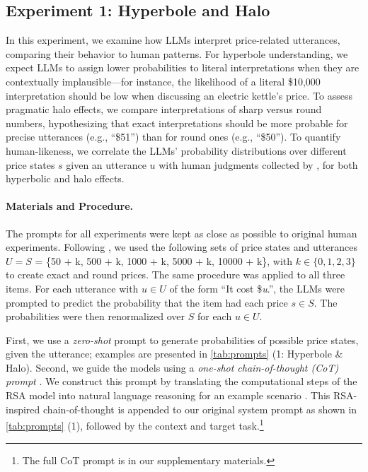 \subsection{Experiment 1: Hyperbole and Halo}
In this experiment, we examine how LLMs interpret price-related utterances, comparing their behavior to human patterns. For hyperbole understanding, we expect LLMs to assign lower probabilities to literal interpretations when they are contextually implausible—for instance, the likelihood of a literal \$10,000 interpretation should be low when discussing an electric kettle's price. To assess pragmatic halo effects, we compare interpretations of sharp versus round numbers, hypothesizing that exact interpretations should be more probable for precise utterances (e.g., ``\$51'') than for round ones (e.g., ``\$50''). To quantify human-likeness, we correlate the LLMs' probability distributions over different price states $s$ given an utterance $u$ with human judgments collected by \citet{kao2014nonliteral}, for both hyperbolic and halo effects.

\paragraph{Materials and Procedure.}  
The prompts for all experiments were kept as close as possible to original human experiments. Following \citet{kao2014nonliteral}, we used the following sets of price states and utterances $U = S$ = \{50 + k, 500 + k, 1000 + k, 5000 + k, 10000 + k\}, with $k \in \{0, 1, 2, 3\}$ to create exact and round prices.
The same procedure was applied to all three items.
For each utterance with $u \in U$ of the form ``It cost \$\textit{u}.'', the LLMs were prompted to predict the probability that the item had each price $s \in S$. The probabilities were then renormalized over $S$ for each $u \in U$. 

First, we use a \textit{zero-shot} prompt to generate probabilities of possible price states, given the utterance; examples are presented in \autoref{tab:prompts} (1: Hyperbole \& Halo). 
Second, we guide the models using a \textit{one-shot chain-of-thought (CoT) prompt} \citep{nye2021show,wei2022chain}. We construct this prompt by translating the computational steps of the RSA model into natural language reasoning for an example scenario \citep[following][]{prystawski2023psychologically}. This RSA-inspired chain-of-thought is appended to our original system prompt as shown in \autoref{tab:prompts} (1), followed by the context and target task.\footnote{The full CoT prompt is in our supplementary materials.} 

